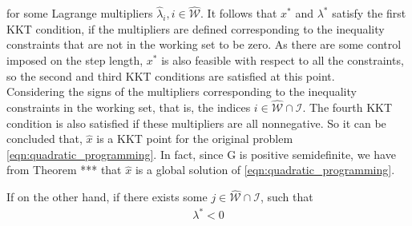 for some Lagrange multipliers $\hat{\lambda}_i,i \in \hat{\mathcal{W}}$.  It follows that $x^*$ and $\lambda^*$ satisfy the first KKT condition, if the multipliers are defined corresponding to the inequality constraints that are not in the working set to be zero. As there are some control imposed on the step length, $x^*$ is also feasible with respect to all the constraints, so the second and third KKT conditions are satisfied at this point.\\

Considering the signs of the multipliers corresponding to the inequality constraints in the working set, that is, the indices $i\in \hat{\mathcal{W}} \cap \mathcal{I}$. The fourth KKT condition is also satisfied if these multipliers are all nonnegative. So it can be concluded that, $\hat{x}$ is a KKT point for the original problem \ref{eqn:quadratic_programming}. In fact, since G is positive semidefinite, we have from Theorem *** that $\hat{x}$ is a global solution of \ref{eqn:quadratic_programming}.

If on the other hand, if there exists some $j \in \hat{\mathcal{W}}\cap \mathcal{I}$, such that
\begin{equation*}
	\begin{aligned}
		\lambda^* < 0
	\end{aligned}
\end{equation*}

